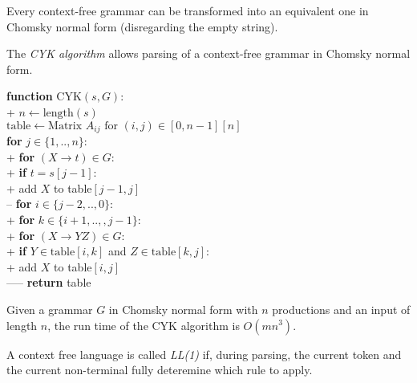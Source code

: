 \documentclass{article}
\begin{document}
\begin{lemma}
	Every context-free grammar can be transformed into an
	equivalent one in Chomsky normal form (disregarding
	the empty string).
\end{lemma}

\begin{definition}
	The \emph{CYK algorithm} allows parsing of a context-free
	grammar in Chomsky normal form.
	\begin{pseudo}
		\textbf{function} \textsf{CYK}$(s,G)$:\\+
		$n\leftarrow\text{length}(s)$\\
		$\text{table}\leftarrow\text{Matrix }A_{ij}\text{ for }(i,j)\in[0,n-1][n]$\\
		\textbf{for} $j\in\{1,..,n\}$:\\+
		\textbf{for} $(X\to t)\in G$:\\+
		\textbf{if} $t=s[j-1]$:\\+
		add $X$ to table$[j-1,j]$\\--
		\textbf{for} $i\in\{j-2,..,0\}$:\\+
		\textbf{for} $k\in\{i+1,..,,j-1\}$:\\+
		\textbf{for} $(X\to YZ)\in G$:\\+
		\textbf{if} $Y\in\text{table}[i,k]$ and $Z\in\text{table}[k,j]$:\\+
		add $X$ to table$[i,j]$\\-----
		\textbf{return} table
	\end{pseudo}
\end{definition}

\begin{theorem}
	Given a grammar $G$ in Chomsky normal form with $n$
	productions and an input of length $n$, the run time
	of the CYK algorithm is $O(mn^3)$.
\end{theorem}

\begin{definition}[L22]
	A context free language is called \emph{LL(1)} if, during
	parsing, the current token and the current non-terminal fully
	deteremine which rule to apply.
\end{definition}
\end{document}
